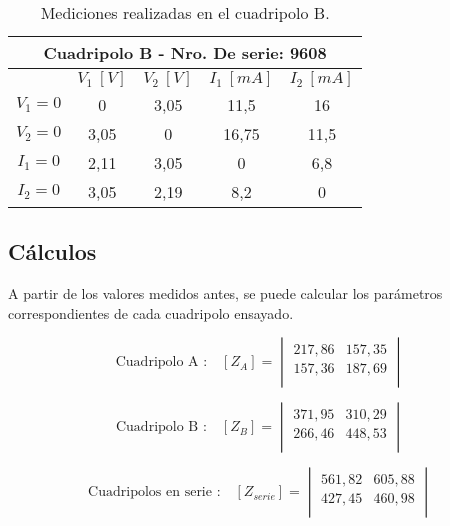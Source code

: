 \documentclass[a4paper]{article}
\begin{document}
\begin{table}[H]
\begin{center}
\begin{tabular}{|c|c|c|c|c|}
\hline
\multicolumn{5}{|c|}{Cuadripolo B - Nro. De serie: 9608} \\ \hline
 & $V_1 \ [V]$ & $V_2 \ [V]$ & $I_1 \ [mA]$ & $I_2 \ [mA]$ \\ \hline
$V_1 = 0$ & 0 & 3,05 & 11,5 & 16 \\ \hline
$V_2 = 0$ & 3,05 & 0 & 16,75 & 11,5 \\ \hline
$I_1 = 0$ & 2,11 & 3,05 & 0 & 6,8 \\ \hline
$I_2 = 0$ & 3,05 & 2,19 & 8,2 & 0 \\ \hline
\end{tabular}
\caption{Mediciones realizadas en el cuadripolo B.}
\end{center}
\end{table}

\subsection*{Cálculos}

A partir de los valores medidos antes, se puede calcular los parámetros correspondientes de cada cuadripolo ensayado.

\begin{equation}
\text{Cuadripolo A :}\quad [Z_{A}] =
\begin{vmatrix}
	217,86 & 157,35\\
	157,36 & 187,69\\
\end{vmatrix}
\end{equation}

\begin{equation}
\text{Cuadripolo B :}\quad [Z_{B}] =
\begin{vmatrix}
	371,95 & 310,29\\
	266,46 & 448,53\\
\end{vmatrix}
\end{equation}

\begin{equation}
\text{Cuadripolos en serie :}\quad [Z_{serie}] =
\begin{vmatrix}
	561,82 & 605,88\\
	427,45 & 460,98\\
\end{vmatrix}
\end{equation}
\end{document}
